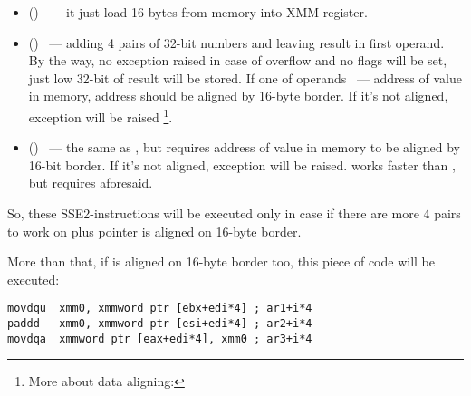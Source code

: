 \begin{itemize}
\item
\MOVDQU () ~--- 
{it just load 16 bytes from memory into XMM-register}.

\item
\PADDD () ~--- 
{adding 4 pairs of 32-bit numbers and leaving result in first operand.
By the way, no exception raised in case of overflow and no flags will be set, just low 32-bit of result will
be stored.
If one of \PADDD operands ~--- address of value in memory,
address should be aligned by 16-byte border. If it's not aligned, exception will be raised
\footnote{More about data aligning: \URLWPDA}.}

\item
\MOVDQA () ~--- 
{the same as \MOVDQU, but requires address of value in memory to be aligned by 16-bit border.
If it's not aligned, exception will be raised.
\MOVDQA works faster than \MOVDQU, but requires aforesaid.}

\end{itemize}

{So, these SSE2-instructions will be executed only in case if there are more 4 pairs to work on
plus pointer  is aligned on 16-byte border.}

{More than that, if  is aligned on 16-byte border too, this piece of code will be executed:}

\begin{lstlisting}
movdqu  xmm0, xmmword ptr [ebx+edi*4] ; ar1+i*4
paddd   xmm0, xmmword ptr [esi+edi*4] ; ar2+i*4
movdqa  xmmword ptr [eax+edi*4], xmm0 ; ar3+i*4
\end{lstlisting}

